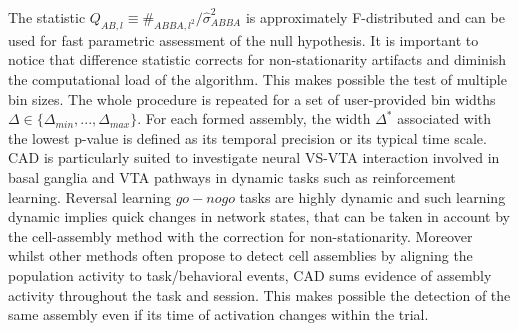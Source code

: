 The statistic $Q_{AB,l}\equiv \#_{ABBA,l^2}/\hat{\sigma}_{ABBA}^2$ is approximately F-distributed and can be used for fast parametric assessment of the null hypothesis. It is important to notice that difference statistic corrects for non-stationarity artifacts and diminish the computational load of the algorithm. This makes possible the test of multiple bin sizes. The whole procedure is repeated for a set of user-provided bin widths $\Delta \in \{\Delta_{min},...,\Delta_{max}\}$. For each formed assembly, the width $\Delta^*$ associated with the lowest p-value is defined as its temporal precision or its typical time scale.\\CAD is particularly suited to investigate neural VS-VTA interaction involved in basal ganglia and VTA pathways in dynamic tasks such as reinforcement learning. Reversal learning $go-no go$ tasks are highly dynamic and such learning dynamic implies quick changes in network states, that can be taken in account by the cell-assembly method with the correction for non-stationarity. Moreover whilst other methods often propose to detect cell assemblies by aligning the population activity to
task/behavioral events, CAD sums evidence of assembly activity throughout the task and session. This makes possible the detection of the same assembly even if its time of activation changes within the trial.

